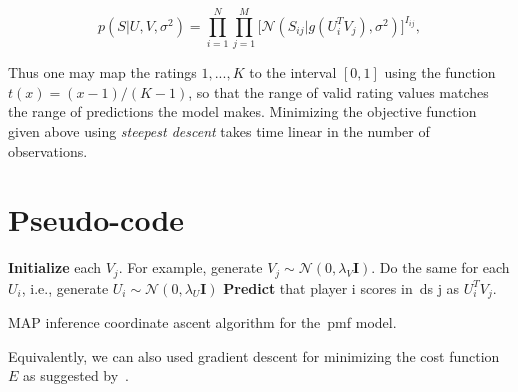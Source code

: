 \begin{equation}
p(S|U,V,\sigma^{2}) = \prod_{i=1}^{N}\prod_{j=1}^{M} \Bigg[ \mathcal{N}(S_{ij}|g(U^{T}_{i}V_{j}),\sigma^{2}) \Bigg]^{I_{ij}},
\end{equation}

Thus one may map the ratings $1, ..., K$ to the interval $[0, 1]$ using the function $t(x) = (x - 1)/(K - 1)$, so that the range of valid rating values matches the range of predictions the model makes. Minimizing the objective function given above using \textit{steepest descent} takes time linear in the number of observations.

\section{Pseudo-code}
\begin{center}
\begin{algorithm}[H]
 \textbf{Initialize} each $V_{j}$. For example, generate $V_{j} \sim \mathcal{N}(0, \lambda_{V}\boldsymbol{I})$. Do the same for each $U_{i}$, i.e., generate $U_{i} \sim \mathcal{N}(0, \lambda_{U}\boldsymbol{I})$\;
 \textbf{Predict} that player i scores in~\gls{ds} j as $U_{i}^{T}V_j$.
 \caption{MAP inference coordinate ascent algorithm for the~\gls{pmf} model.}
\end{algorithm}
\end{center}

Equivalently, we can also used gradient descent for minimizing the cost function $E$ as suggested by~\cite{mnih_probabilistic_2008}.